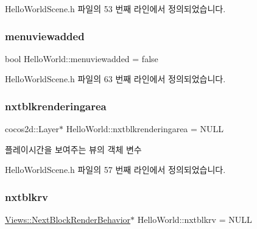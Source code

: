 Hello\+World\+Scene.\+h 파일의 53 번째 라인에서 정의되었습니다.

\mbox{\label{class_hello_world_a1e1896c9d67df38903e55eb6782978d8}} 
\subsubsection{\texorpdfstring{menuviewadded}{menuviewadded}}
{\footnotesize\ttfamily bool Hello\+World\+::menuviewadded = false\hspace{0.3cm}{\ttfamily [protected]}}



Hello\+World\+Scene.\+h 파일의 63 번째 라인에서 정의되었습니다.

\mbox{\label{class_hello_world_a6ebd3cb915150357bd357df1ff4da932}} 
\subsubsection{\texorpdfstring{nxtblkrenderingarea}{nxtblkrenderingarea}}
{\footnotesize\ttfamily cocos2d\+::\+Layer$\ast$ Hello\+World\+::nxtblkrenderingarea = N\+U\+LL\hspace{0.3cm}{\ttfamily [protected]}}



플레이시간을 보여주는 뷰의 객체 변수 



Hello\+World\+Scene.\+h 파일의 57 번째 라인에서 정의되었습니다.

\mbox{\label{class_hello_world_ac06ca16fc5a18d32c58e0229c24817f6}} 
\subsubsection{\texorpdfstring{nxtblkrv}{nxtblkrv}}
{\footnotesize\ttfamily \hyperlink{class_tetris_1_1_views_1_1_next_block_render_behavior}{Views\+::\+Next\+Block\+Render\+Behavior}$\ast$ Hello\+World\+::nxtblkrv = N\+U\+LL\hspace{0.3cm}{\ttfamily [protected]}}



